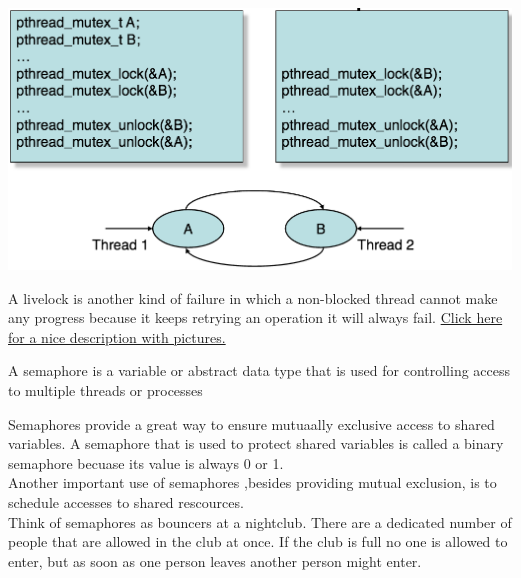 \begin{center} %
    \includegraphics[scale=0.5]{threads/deadlock.png}
\end{center}

A livelock is another kind of failure in which a non-blocked thread cannot make any progress because it keeps retrying an operation it will always fail.
\href{http://www.guruzon.com/1/threading/multithreading-concepts/what-is-live-lock
}{Click here for a nice description with pictures.}




A semaphore is a variable or abstract data type that is used for controlling access to multiple threads or processes

Semaphores provide a great way to ensure mutuaally exclusive access to shared variables.  A semaphore that is used to protect shared variables is called a binary semaphore becuase its value is always 0 or 1.\\

Another important use of semaphores ,besides providing mutual exclusion, is to schedule accesses to shared rescources.\\

Think of semaphores as bouncers at a nightclub. There are a dedicated number of people that are allowed in the club at once. If the club is full no one is allowed to enter, but as soon as one person leaves another person might enter.
